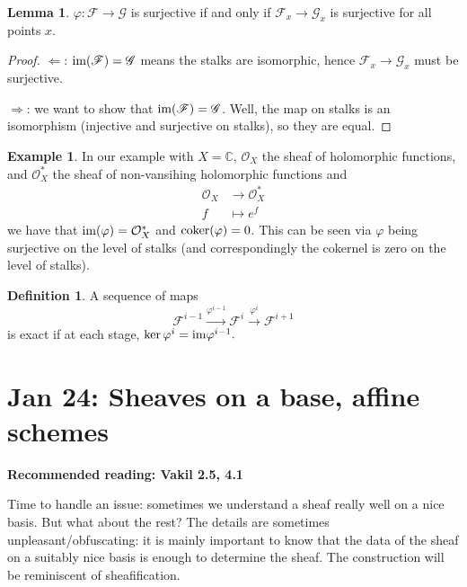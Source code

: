 \documentclass[10pt,reqno]{amsart}
\theoremstyle{definition}
\newtheorem{example}[theorem]{Example}
\newtheorem{definition}[theorem]{Definition}
\newtheorem{lemma}[theorem]{Lemma}
\theoremstyle{remark}
\numberwithin{equation}{section}
\numberwithin{theorem}{section}
\newcommand{\C}{{\mathbb C}}
\newcommand{\OO}{{\mathcal O}}
\newcommand{\im}{\textup{im}}
\newcommand{\coker}{\textup{coker}}
\newcommand{\FF}{{\mathscr F}}
\newcommand{\GG}{{\mathscr G}}
\begin{document}
\begin{lemma} $\varphi: \FF \to \GG$ is surjective if and only if $\FF_x \to \GG_x$ is surjective for all points $x$.
\end{lemma}
\begin{proof}\text{ }
$\Leftarrow$: $\im(\FF) = \GG$ means the stalks are isomorphic, hence $\FF_x \to \GG_x$ must be surjective.

$\Rightarrow$: we want to show that $\im(\FF) = \GG$. Well, the map on stalks is an isomorphism (injective and surjective on stalks), so they are equal.
\end{proof}

\begin{example} In our example with $X = \C$, $\OO_X$ the sheaf of holomorphic functions, and $\OO_X^*$ the sheaf of non-vansihing holomorphic functions and 
\begin{align*}
\OO_X &\to \OO_X^*\\
f &\mapsto e^f
\end{align*}
we have that $\im(\varphi) = \OO_X^*$ and $\coker(\varphi) = 0$. This can be seen via $\varphi$ being surjective on the level of stalks (and correspondingly the cokernel is zero on the level of stalks).
\end{example}

\begin{definition} A sequence of maps
\[\FF^{i-1} \stackrel{\varphi^{i-1}}{\to} \FF^i \stackrel{\varphi^i}{\to} \FF^{i+1}\]
is exact if at each stage, $\ker \varphi^{i} = \im \varphi^{i-1}.$
\end{definition}
\section{Jan 24: Sheaves on a base, affine schemes}
\textbf{Recommended reading: Vakil 2.5, 4.1}

Time to handle an issue: sometimes we understand a sheaf really well on a nice basis. But what about the rest? The details are sometimes unpleasant/obfuscating: it is mainly important to know that the data of the sheaf on a suitably nice basis is enough to determine the sheaf. The construction will be reminiscent of sheafification.
\end{document}
